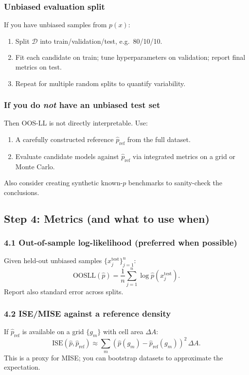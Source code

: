 \documentclass[twocolumn]{notes}
\begin{document}
\subsubsection{Unbiased evaluation split}
If you have unbiased samples from $p(x)$:
\begin{enumerate}[leftmargin=2em]
\item Split $\mathcal{D}$ into train/validation/test, e.g.\ 80/10/10.
\item Fit each candidate on train; tune hyperparameters on validation; report final metrics on test.
\item Repeat for multiple random splits to quantify variability.
\end{enumerate}

\subsubsection{If you do \emph{not} have an unbiased test set}
Then OOS-LL is not directly interpretable. Use:
\begin{enumerate}[leftmargin=2em]
\item A carefully constructed reference $\hat p_{\mathrm{ref}}$ from the full dataset.
\item Evaluate candidate models against $\hat p_{\mathrm{ref}}$ via integrated metrics on a grid or Monte Carlo.
\end{enumerate}
Also consider creating synthetic known-$p$ benchmarks to sanity-check the conclusions.

\subsection{Step 4: Metrics (and what to use when)}

\subsubsection{4.1 Out-of-sample log-likelihood (preferred when possible)}
Given held-out unbiased samples $\{x_j^{\mathrm{test}}\}_{j=1}^n$:
\[
\mathrm{OOSLL}(\hat p)=\frac{1}{n}\sum_{j=1}^n \log \hat p(x_j^{\mathrm{test}}).
\]
Report also standard error across splits.

\subsubsection{4.2 ISE/MISE against a reference density}
If $\hat p_{\mathrm{ref}}$ is available on a grid $\{g_m\}$ with cell area $\Delta A$:
\[
\mathrm{ISE}(\hat p,\hat p_{\mathrm{ref}})\approx \sum_m\left(\hat p(g_m)-\hat p_{\mathrm{ref}}(g_m)\right)^2\,\Delta A.
\]
This is a proxy for MISE; you can bootstrap datasets to approximate the expectation.
\end{document}
